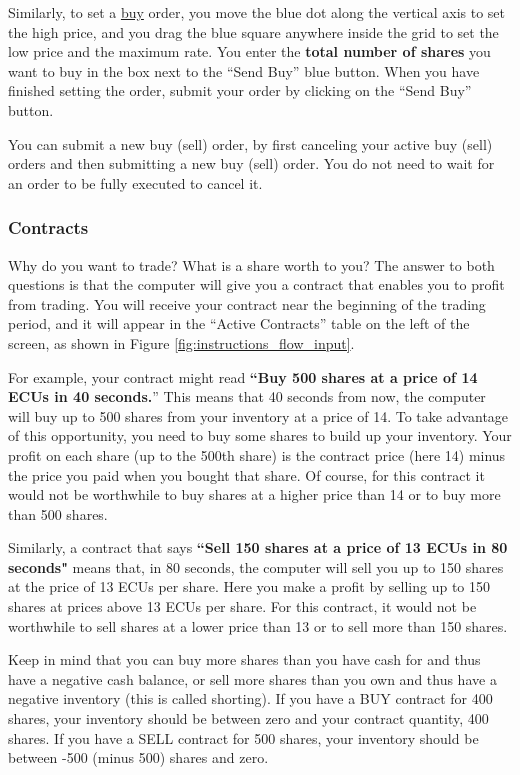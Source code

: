 \documentclass[12pt]{article}
\begin{document}
\begin{singlespace}
Similarly, to set a \ul{buy} order, you move the blue dot along the
vertical axis to set the high price, and you drag the blue square
anywhere inside the grid to set the low price and the maximum rate. You
enter the \textbf{total number of shares} you want to buy in the box
next to the ``Send Buy'' blue button. When you have finished setting the
order, submit your order by clicking on the ``Send Buy'' button.

You can submit a new buy (sell) order, by first canceling your active
buy (sell) orders and then submitting a new buy (sell) order. You do not
need to wait for an order to be fully executed to cancel it.

\subsubsection*{Contracts}\label{contracts_flow}

Why do you want to trade? What is a share worth to you? The answer to
both questions is that the computer will give you a contract that
enables you to profit from trading. You will receive your contract near
the beginning of the trading period, and it will appear in the ``Active
Contracts'' table on the left of the screen, as shown in Figure \ref{fig:instructions_flow_input}.

For example, your contract might read \textbf{``Buy 500 shares at a
price of 14 ECUs in 40 seconds.}'' This means that 40 seconds from now,
the computer will buy up to 500 shares from your inventory at a price of
14. To take advantage of this opportunity, you need to buy some shares
to build up your inventory. Your profit on each share (up to the 500th
share) is the contract price (here 14) minus the price you paid when you
bought that share. Of course, for this contract it would not be
worthwhile to buy shares at a higher price than 14 or to buy more than
500 shares.

Similarly, a contract that says \textbf{``Sell 150 shares at a price of
13 ECUs in 80 seconds"} means that, in 80 seconds, the computer will
sell you up to 150 shares at the price of 13 ECUs per share. Here you
make a profit by selling up to 150 shares at prices above 13 ECUs per
share. For this contract, it would not be worthwhile to sell shares at a
lower price than 13 or to sell more than 150 shares.

Keep in mind that you can buy more shares than you have cash for and
thus have a negative cash balance, or sell more shares than you own and
thus have a negative inventory (this is called shorting). If you have a
BUY contract for 400 shares, your inventory should be between zero and
your contract quantity, 400 shares. If you have a SELL contract for 500
shares, your inventory should be between -500 (minus 500) shares and
zero.


\end{singlespace}
\end{document}
